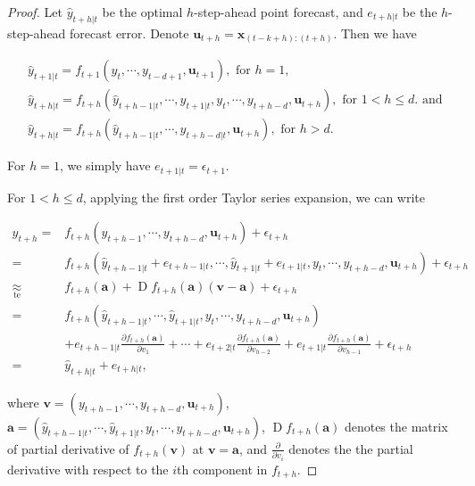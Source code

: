 \documentclass[
  11pt,
  a4paper,
]{article}
\theoremstyle{plain}
\theoremstyle{plain}
\theoremstyle{remark}
\begin{document}
\begin{proof}
Let \(\hat{y}_{t+h|t}\) be the optimal \(h\)-step-ahead point forecast,
and \(e_{t+h|t}\) be the \(h\)-step-ahead forecast error. Denote
\(\bm{u}_{t+h}=\bm{x}_{(t-k+h):(t+h)}\). Then we have

\[
\begin{aligned}
&\hat{y}_{t+1|t}=f_{t+1}(y_t,\cdots,y_{t-d+1},\bm{u}_{t+1}), \text{ for } h=1, \\
&\hat{y}_{t+h|t}=f_{t+h}\left(\hat{y}_{t+h-1|t},\cdots,\hat{y}_{t+1|t},y_t,\cdots,y_{t+h-d},\bm{u}_{t+h}\right), \text{ for } 1 < h \leq d. \text{ and } \\
&\hat{y}_{t+h|t}=f_{t+h}\left(\hat{y}_{t+h-1|t},\cdots,\hat{y}_{t+h-d|t},\bm{u}_{t+h}\right), \text{ for } h > d.
\end{aligned}
\]

For \(h=1\), we simply have \(e_{t+1|t} = \epsilon_{t+1}\).

For \(1<h\leq d\), applying the first order Taylor series expansion, we
can write

\[
\begin{aligned}
y_{t+h}
=&f_{t+h}\left(y_{t+h-1},\cdots,y_{t+h-d},\bm{u}_{t+h}\right)+\epsilon_{t+h} \\
=&f_{t+h}\left(\hat{y}_{t+h-1|t}+e_{t+h-1|t},\cdots,\hat{y}_{t+1|t}+e_{t+1|t},y_{t},\cdots,y_{t+h-d},\bm{u}_{t+h}\right)+\epsilon_{t+h} \\
\underset{\text{te}}{\approx}&f_{t+h}\left(\bm{a}\right)+\operatorname{D}f_{t+h}\left(\bm{a}\right)\left(\bm{v}-\bm{a}\right)+
\epsilon_{t+h} \\
=&f_{t+h}\left(\hat{y}_{t+h-1|t},\cdots,\hat{y}_{t+1|t},y_{t},\cdots,y_{t+h-d},\bm{u}_{t+h}\right) \\
&+e_{t+h-1|t}\frac{\partial f_{t+h}\left(\bm{a}\right)}{\partial v_1}+\cdots+e_{t+2|t}\frac{\partial f_{t+h}\left(\bm{a}\right)}{\partial v_{h-2}}+e_{t+1|t}\frac{\partial f_{t+h}\left(\bm{a}\right)}{\partial v_{h-1}}+\epsilon_{t+h} \\
=&\hat{y}_{t+h|t}+e_{t+h|t},
\end{aligned}
\]

where \(\bm{v}=\left(y_{t+h-1},\cdots,y_{t+h-d},\bm{u}_{t+h}\right)\),
\(\bm{a} =\left(\hat{y}_{t+h-1|t},\cdots,\hat{y}_{t+1|t},y_{t},\cdots,y_{t+h-d},\bm{u}_{t+h}\right)\),
\(\operatorname{D}f_{t+h}\left(\bm{a}\right)\) denotes the matrix of
partial derivative of \(f_{t+h}(\bm{v})\) at \(\bm{v}=\bm{a}\), and
\(\frac{\partial}{\partial v_i}\) denotes the the partial derivative
with respect to the \(i\)th component in \(f_{t+h}\).


\end{proof}
\end{document}
